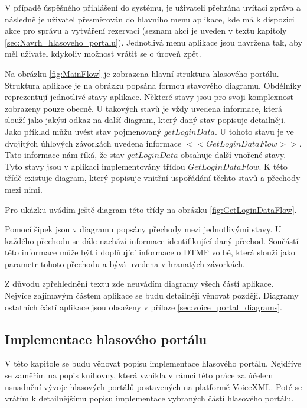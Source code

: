 \documentclass[ing,male,java,dept460,twoside]{diploma}						%
\begin{document}

V případě úspěšného přihlášení do systému, je uživateli přehrána uvítací zpráva a následně je uživatel přesměrován do hlavního menu aplikace, kde má k dispozici akce pro správu a vytváření rezervací (seznam akcí je uveden v textu kapitoly \ref{sec:Navrh_hlasoveho_portalu}). Jednotlivá menu aplikace jsou navržena tak, aby měl uživatel kdykoliv možnost vrátit se o úroveň zpět.

Na obrázku \ref{fig:MainFlow} je zobrazena hlavní struktura hlasového portálu. Struktura aplikace je na obrázku popsána formou stavového diagramu. Obdélníky reprezentují jednotlivé stavy aplikace. Některé stavy jsou pro svoji komplexnost zobrazeny pouze obecně. U takových stavů je vždy uvedena informace, která slouží jako jakýsi odkaz na další diagram, který daný stav popisuje detailněji. Jako příklad můžu uvést stav pojmenovaný $getLoginData$. U tohoto stavu je ve dvojitých úhlových závorkách uvedena informace $<<GetLoginDataFlow>>$. Tato informace nám říká, že stav $getLoginData$ obsahuje další vnořené stavy. Tyto stavy jsou v aplikaci implementovány třídou $GetLoginDataFlow$. K této třídě existuje diagram, který popisuje vnitřní uspořádání těchto stavů a přechody mezi nimi.

Pro ukázku uvádím ještě diagram této třídy na obrázku \ref{fig:GetLoginDataFlow}.


Pomocí šipek jsou v diagramu popsány přechody mezi jednotlivými stavy. U každého přechodu se dále nachází informace identifikující daný přechod. Součástí této informace může být i doplňující informace o DTMF volbě, která slouží jako parametr tohoto přechodu a bývá uvedena v hranatých závorkách.

Z důvodu zpřehlednění textu zde neuvádím diagramy všech částí aplikace. Nejvíce zajímavým částem aplikace se budu detailněji věnovat později. Diagramy ostatních částí aplikace jsou obsaženy v příloze \ref{sec:voice_portal_diagrams}.

\subsection{Implementace hlasového portálu}
V této kapitole se budu věnovat popisu implementace hlasového portálu. Nejdříve se zaměřím na popis knihovny, která vznikla v rámci této práce za účelem usnadnění vývoje hlasových portálů postavených na platformě VoiceXML. Poté se vrátím k detailnějšímu popisu implementace vybraných částí hlasového portálu.
\end{document}
